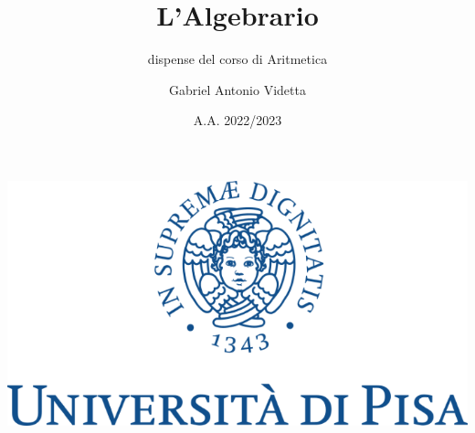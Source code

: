 \documentclass[11pt]{scrartcl}
\theoremstyle{definition}
\begin{document}
\title{L'Algebrario}
\subtitle{dispense del corso di Aritmetica}
\author{Gabriel Antonio Videtta}
\date{A.A. 2022/2023}
\maketitle
\thispagestyle{empty}

\begin{center}
	\includegraphics[scale=0.3]{logo.png}
\end{center}

\newpage
\thispagestyle{empty}
~\newpage



\newpage
\thispagestyle{empty}
~\newpage

\tableofcontents

\newpage
\thispagestyle{empty}
~\newpage



\newpage
\thispagestyle{empty}
~\newpage



\newpage
\thispagestyle{empty}
~\newpage



\newpage
\thispagestyle{empty}
~\newpage



\newpage
\thispagestyle{empty}
~\newpage



\newpage
\thispagestyle{empty}
~\newpage



\newpage
\thispagestyle{empty}
~\newpage
\end{document}
